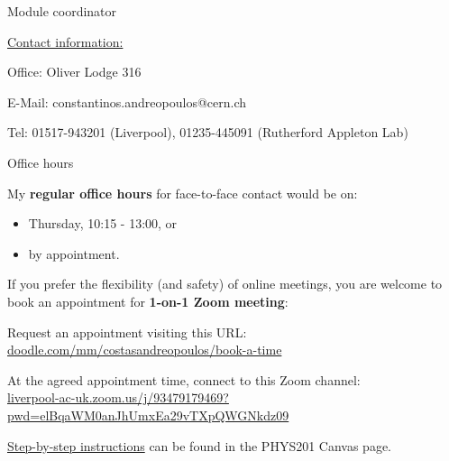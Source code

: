 \begin{frame}{Module coordinator}
\vspace{0.6cm}

\underline{Contact information:}\\
\vspace{0.2cm}
\begin{itemize}
{\small
 \item Office: Oliver Lodge 316
 \item E-Mail: constantinos.andreopoulos@cern.ch
 \item Tel: 01517-943201 (Liverpool), 01235-445091 (Rutherford Appleton Lab)
}
\end{itemize}

\end{frame}

%
%
%

\begin{frame}{Office hours}

My {\bf regular office hours} for face-to-face contact would be on:
\begin{itemize}
  \item Thursday, 10:15 - 13:00, or
  \item by appointment.
\end{itemize}

\vspace{0.3cm}

If you prefer the flexibility (and safety) of online meetings,
you are welcome to book an appointment for {\bf 1-on-1 Zoom meeting}:
\begin{itemize}
{\small
  \item Request an appointment visiting this URL:
  {\color{blue} \scriptsize \url{doodle.com/mm/costasandreopoulos/book-a-time}}
  \item At the agreed appointment time, connect to this Zoom channel:\\
  {\color{blue} \scriptsize \url{liverpool-ac-uk.zoom.us/j/93479179469?pwd=elBqaWM0anJhUmxEa29vTXpQWGNkdz09}}
}
\end{itemize}

\vspace{0.2cm}
\underline{Step-by-step instructions} can be found in the PHYS201 Canvas page.\\

\end{frame}


%
%

